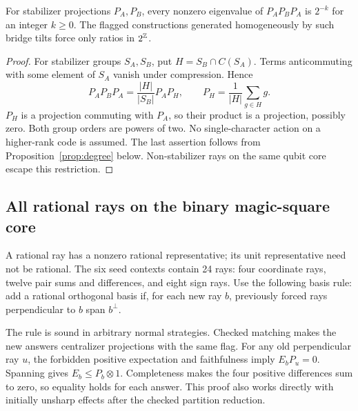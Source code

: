 \begin{proposition}\label{prop:pauli}
For stabilizer projections $P_A,P_B$, every nonzero eigenvalue of $P_AP_BP_A$ is $2^{-k}$ for an integer $k\ge0$. The flagged constructions generated homogeneously by such bridge tilts force only ratios in $2^\mathbb Z$.
\end{proposition}
\begin{proof}
For stabilizer groups $S_A,S_B$, put $H=S_B\cap C(S_A)$. Terms anticommuting with some element of $S_A$ vanish under compression. Hence
\[
 P_AP_BP_A=\frac{|H|}{|S_B|}P_AP_H,
 \qquad P_H=\frac1{|H|}\sum_{g\in H}g.
\]
$P_H$ is a projection commuting with $P_A$, so their product is a projection, possibly zero. Both group orders are powers of two. No single-character action on a higher-rank code is assumed. The last assertion follows from Proposition~\ref{prop:degree} below. Non-stabilizer rays on the same qubit core escape this restriction.
\end{proof}

\subsection{All rational rays on the binary magic-square core}
A rational ray has a nonzero rational representative; its unit representative need not be rational. The six seed contexts contain 24 rays: four coordinate rays, twelve pair sums and differences, and eight sign rays. Use the following basis rule: add a rational orthogonal basis if, for each new ray $b$, previously forced rays perpendicular to $b$ span $b^\perp$.

The rule is sound in arbitrary normal strategies. Checked matching makes the new answers centralizer projections with the same flag. For any old perpendicular ray $u$, the forbidden positive expectation and faithfulness imply $E_bP_u=0$. Spanning gives $E_b\le P_b\otimes1$. Completeness makes the four positive differences sum to zero, so equality holds for each answer. This proof also works directly with initially unsharp effects after the checked partition reduction.

